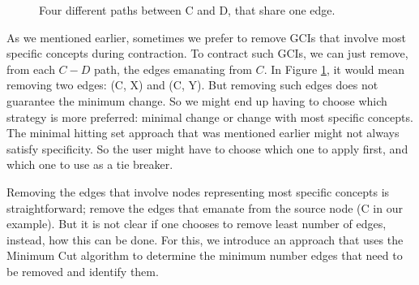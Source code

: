 \begin{figure}
\centering
{}
\caption{Four different paths between C and D, that share one edge.}
\label{ex1}
\end{figure}

As we mentioned earlier, sometimes we prefer to remove GCIs that involve most specific concepts during contraction. To contract such GCIs, we can just remove, from each $C-D$ path, the edges emanating from $C$. In Figure \ref{ex1}, it would mean removing two edges: (C, X) and (C, Y). But removing such edges does not guarantee the minimum change. So we might end up having to choose which strategy is more preferred: minimal change or change with most specific concepts. The minimal hitting set approach that was mentioned earlier might not always satisfy specificity. So the user might have to choose which one to apply first, and which one to use as a tie breaker.

Removing the edges that involve nodes representing most specific concepts is straightforward; remove the edges that emanate from the source node (C in our example). But it is not clear if one chooses to remove least number of edges, instead, how this can be done. For this, we introduce an approach that uses the Minimum Cut algorithm to determine the minimum number edges that need to be removed and identify them.

